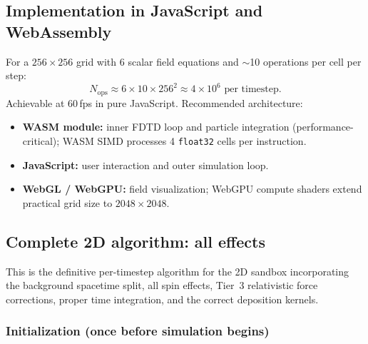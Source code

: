 \documentclass[11pt,a4paper]{article}
\begin{document}
\subsection{Implementation in JavaScript and WebAssembly}

For a $256\times 256$ grid with 6 scalar field equations and $\sim$10 operations per cell per step:
\begin{equation}
  N_{\mathrm{ops}} \approx 6 \times 10 \times 256^2 \approx 4\times 10^6 \text{ per timestep.}
\end{equation}
Achievable at 60\,fps in pure JavaScript.  Recommended architecture:
\begin{itemize}
  \item \textbf{WASM module:} inner FDTD loop and particle integration (performance-critical); WASM SIMD processes 4 \texttt{float32} cells per instruction.
  \item \textbf{JavaScript:} user interaction and outer simulation loop.
  \item \textbf{WebGL / WebGPU:} field visualization; WebGPU compute shaders extend practical grid size to $2048\times 2048$.
\end{itemize}

\subsection{Complete 2D algorithm: all effects}
\label{sec:alg_2d}

This is the definitive per-timestep algorithm for the 2D sandbox incorporating the background spacetime split, all spin effects, Tier~3 relativistic force corrections, proper time integration, and the correct deposition kernels.

\subsubsection*{Initialization (once before simulation begins)}
\end{document}
